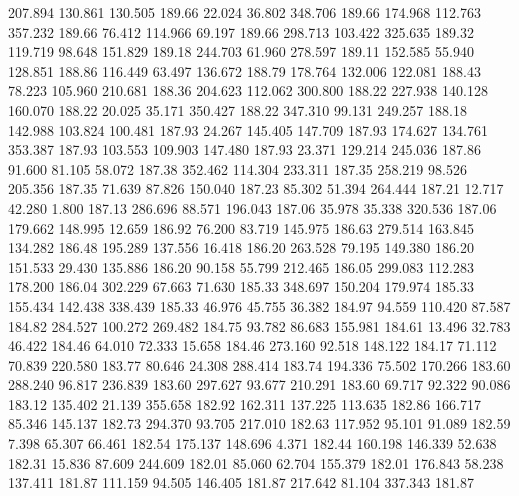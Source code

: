  207.894  130.861  130.505       189.66
  22.024   36.802  348.706       189.66
 174.968  112.763  357.232       189.66
  76.412  114.966   69.197       189.66
 298.713  103.422  325.635       189.32
 119.719   98.648  151.829       189.18
 244.703   61.960  278.597       189.11
 152.585   55.940  128.851       188.86
 116.449   63.497  136.672       188.79
 178.764  132.006  122.081       188.43
  78.223  105.960  210.681       188.36
 204.623  112.062  300.800       188.22
 227.938  140.128  160.070       188.22
  20.025   35.171  350.427       188.22
 347.310   99.131  249.257       188.18
 142.988  103.824  100.481       187.93
  24.267  145.405  147.709       187.93
 174.627  134.761  353.387       187.93
 103.553  109.903  147.480       187.93
  23.371  129.214  245.036       187.86
  91.600   81.105   58.072       187.38
 352.462  114.304  233.311       187.35
 258.219   98.526  205.356       187.35
  71.639   87.826  150.040       187.23
  85.302   51.394  264.444       187.21
  12.717   42.280    1.800       187.13
 286.696   88.571  196.043       187.06
  35.978   35.338  320.536       187.06
 179.662  148.995   12.659       186.92
  76.200   83.719  145.975       186.63
 279.514  163.845  134.282       186.48
 195.289  137.556   16.418       186.20
 263.528   79.195  149.380       186.20
 151.533   29.430  135.886       186.20
  90.158   55.799  212.465       186.05
 299.083  112.283  178.200       186.04
 302.229   67.663   71.630       185.33
 348.697  150.204  179.974       185.33
 155.434  142.438  338.439       185.33
  46.976   45.755   36.382       184.97
  94.559  110.420   87.587       184.82
 284.527  100.272  269.482       184.75
  93.782   86.683  155.981       184.61
  13.496   32.783   46.422       184.46
  64.010   72.333   15.658       184.46
 273.160   92.518  148.122       184.17
  71.112   70.839  220.580       183.77
  80.646   24.308  288.414       183.74
 194.336   75.502  170.266       183.60
 288.240   96.817  236.839       183.60
 297.627   93.677  210.291       183.60
  69.717   92.322   90.086       183.12
 135.402   21.139  355.658       182.92
 162.311  137.225  113.635       182.86
 166.717   85.346  145.137       182.73
 294.370   93.705  217.010       182.63
 117.952   95.101   91.089       182.59
   7.398   65.307   66.461       182.54
 175.137  148.696    4.371       182.44
 160.198  146.339   52.638       182.31
  15.836   87.609  244.609       182.01
  85.060   62.704  155.379       182.01
 176.843   58.238  137.411       181.87
 111.159   94.505  146.405       181.87
 217.642   81.104  337.343       181.87
